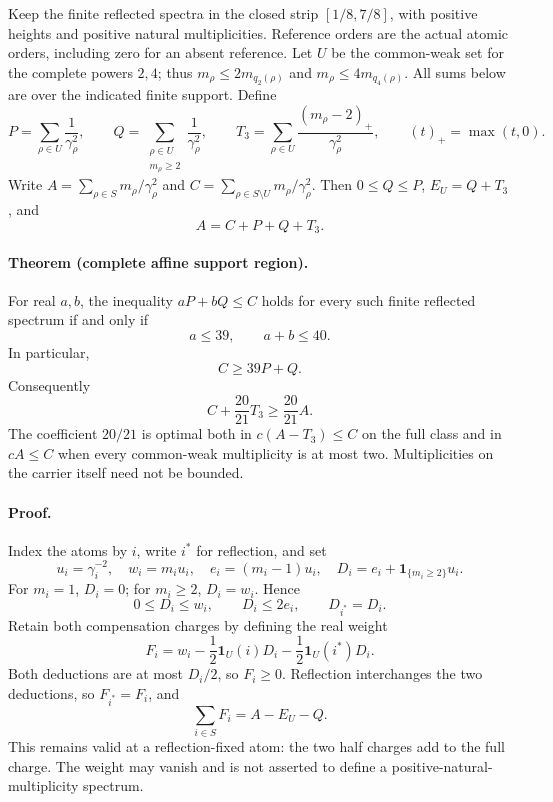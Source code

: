 Keep the finite reflected spectra in the closed strip
\([1/8,7/8]\), with positive heights and positive natural multiplicities.
Reference orders are the actual atomic orders, including zero for an absent
reference. Let \(U\) be the common-weak set for the complete powers \(2,4\);
thus \(m_\rho\le2m_{q_2(\rho)}\) and
\(m_\rho\le4m_{q_4(\rho)}\). All sums below are over the indicated finite
support. Define
\[
 P=\sum_{\rho\in U}\frac1{\gamma_\rho^2},\qquad
 Q=\sum_{\substack{\rho\in U\\m_\rho\ge2}}\frac1{\gamma_\rho^2},\qquad
 T_3=\sum_{\rho\in U}\frac{(m_\rho-2)_+}{\gamma_\rho^2},
 \qquad (t)_+=\max(t,0).
\]
Write \(A=\sum_{\rho\in S}m_\rho/\gamma_\rho^2\) and
\(C=\sum_{\rho\in S\setminus U}m_\rho/\gamma_\rho^2\).
Then \(0\le Q\le P\), \(E_U=Q+T_3\), and
\[
 A=C+P+Q+T_3.
\]

\paragraph{Theorem (complete affine support region).}
For real \(a,b\), the inequality \(aP+bQ\le C\) holds for every such
finite reflected spectrum if and only if
\[
 \boxed{\quad a\le39,\qquad a+b\le40.\quad}
\]
In particular,
\begin{equation}\label{eq:joint-multiplicity-support}
 \boxed{\quad C\ge39P+Q.\quad}
\end{equation}
Consequently
\begin{equation}\label{eq:triple-excess-carrier}
 \boxed{\quad C+\frac{20}{21}T_3\ge\frac{20}{21}A.\quad}
\end{equation}
The coefficient \(20/21\) is optimal both in
\(c(A-T_3)\le C\) on the full class and in \(cA\le C\) when every
common-weak multiplicity is at most two. Multiplicities on the carrier
itself need not be bounded.

\paragraph{Proof.}
Index the atoms by \(i\), write \(i^*\) for reflection, and set
\[
 u_i=\gamma_i^{-2},\quad w_i=m_i u_i,\quad e_i=(m_i-1)u_i,\quad
 D_i=e_i+\mathbf1_{\{m_i\ge2\}}u_i.
\]
For \(m_i=1\), \(D_i=0\); for \(m_i\ge2\), \(D_i=w_i\).
Hence
\[
 0\le D_i\le w_i,\qquad D_i\le2e_i,\qquad D_{i^*}=D_i.
\]
Retain both compensation charges by defining the real weight
\[
 F_i=w_i-\frac12\mathbf1_U(i)D_i
          -\frac12\mathbf1_U(i^*)D_i.
\]
Both deductions are at most \(D_i/2\), so \(F_i\ge0\).
Reflection interchanges the two deductions, so \(F_{i^*}=F_i\), and
\[
 \sum_{i\in S}F_i=A-E_U-Q.
\]
This remains valid at a reflection-fixed atom: the two half charges add
to the full charge. The weight may vanish and is not asserted to define
a positive-natural-multiplicity spectrum.

